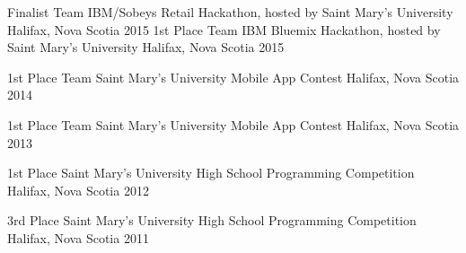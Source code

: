 



\begin{cvhonors}

  \cvhonor
    {Finalist Team} %
    {IBM/Sobeys Retail Hackathon, hosted by Saint Mary's University} %
    {Halifax, Nova Scotia} %
    {2015} %
  \cvhonor
    {1st Place Team} %
    {IBM Bluemix Hackathon, hosted by Saint Mary's University} %
    {Halifax, Nova Scotia} %
    {2015} %

  \cvhonor
    {1st Place Team} %
    {Saint Mary's University Mobile App Contest} %
    {Halifax, Nova Scotia} %
    {2014} %

  \cvhonor
    {1st Place Team} %
    {Saint Mary's University Mobile App Contest} %
    {Halifax, Nova Scotia} %
    {2013} %

  \cvhonor
    {1st Place} %
    {Saint Mary's University High School Programming Competition} %
    {Halifax, Nova Scotia} %
    {2012} %

  \cvhonor
    {3rd Place} %
    {Saint Mary's University High School Programming Competition} %
    {Halifax, Nova Scotia} %
    {2011} %

\end{cvhonors}
